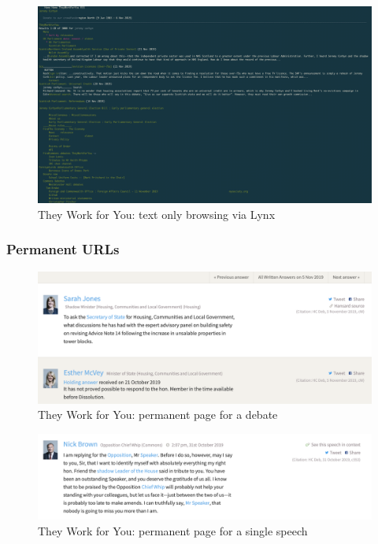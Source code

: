 \documentclass{article}
\begin{document}
			\begin{figure}[h]
				\centering
				\includegraphics[scale=0.2]{images/they-work-for-you-implementation-text-only-lynx}
				\caption{They Work for You: text only browsing via Lynx}
				\label{fig:they-work-for-you-implementation-text-only-lynx}
			\end{figure}

        	\subsubsection*{Permanent URLs}
        	 
        	
			\begin{figure}[h]
				\centering
				\includegraphics[scale=0.5]{images/they-work-for-you-implementation-permanent-urls-1}
				\caption{They Work for You: permanent page for a debate}
				\label{fig:/they-work-for-you-implementation-permanent-urls-1}
			\end{figure}

			\begin{figure}[h]
				\centering
				\includegraphics[scale=0.3]{images/they-work-for-you-implementation-permanent-urls-2}
				\caption{They Work for You: permanent page for a single speech}
				\label{fig:they-work-for-you-implementation-permanent-urls-2}
			\end{figure}
\end{document}
